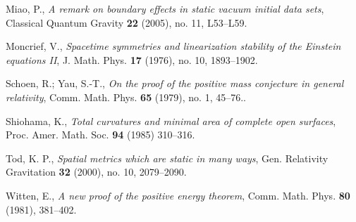 \documentclass[12pt]{amsart}
\theoremstyle{remark}
\numberwithin{equation}{section}
\begin{document}
\begin{thebibliography}{10}
 Miao, P., {\sl A remark on boundary effects in static vacuum initial data sets},
 Classical Quantum Gravity \textbf{22}  (2005), no. 11, L53--L59.

  Moncrief, V.,
{\sl  Spacetime symmetries and linearization stability of the Einstein equations II}, 
J. Math. Phys. \textbf{17}  (1976),  no. 10, 1893--1902.

 Schoen, R.;  Yau, S.-T., {\sl On the proof of the positive mass conjecture in general relativity},
 Comm. Math. Phys.  \textbf{65} (1979), no. 1,  45--76..

   Shiohama, K., {\sl Total curvatures and minimal area of complete open surfaces}, Proc. Amer.
Math. Soc. \textbf{94} (1985) 310--316.

Tod, K. P.,  {\sl Spatial metrics which are static in many ways}, Gen. Relativity Gravitation \textbf{32} (2000), no. 10, 2079--2090.

  Witten, E., {\sl A new proof of the positive energy theorem},
Comm. Math. Phys. \textbf{80}  (1981), 381--402.

\end{thebibliography}
\end{document}
